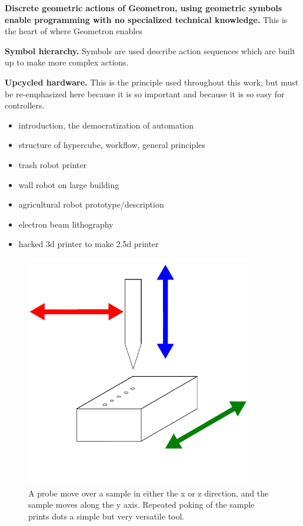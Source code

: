 \textbf{Discrete geometric actions of Geometron, using geometric symbols enable programming with no specialized technical knowledge.}  This is the heart of where Geometron enables 

\textbf{Symbol hierarchy.}  Symbols are used describe action sequences which are built up to make more complex actions.  

\textbf{Upcycled hardware.}  This is the principle used throughout this work, but must be re-emphasized here because it is so important and because it is so easy for controllers.  



\begin{itemize}
\tightlist
\item
introduction, the democratization of automation
\item
structure of hypercube, workflow, general principles
\item
trash robot printer
\item
wall robot on large building
\item
agricultural robot prototype/description
\item
electron beam lithography
\item
hacked 3d printer to make 2.5d printer
\end{itemize}


\begin{figure}
	\centering
	\includegraphics[width=4in]{figures/machines/xyzprobe.png}
	\caption[xyzprobe]
	{A probe move over a sample in either the x or z direction, and the sample moves along the y axis.  Repeated poking of the sample prints dots a simple but very versatile tool.}
\end{figure}


